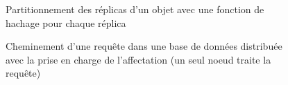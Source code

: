 \documentclass[12pt]{article}
\begin{document}
\begin{figure}[p]
	\centering
		
	\caption{Partitionnement des réplicas d'un objet avec une fonction de hachage pour chaque réplica\label{fig:multi_hash_partitionning}}
\end{figure}

\begin{figure}[p]
	\centering
		
	\caption{Cheminement d'une requête dans une base de données distribuée avec la prise en charge de l'affectation (un seul noeud traite la requête)\label{fig:request}}
\end{figure}
\end{document}

